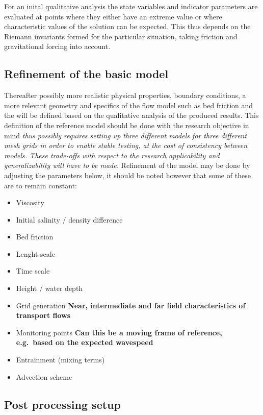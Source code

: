 For an inital qualitative analysis the state variables and indicator
parameters are evaluated at points where they either have an extreme
value or where characteristic values of the solution can be expected.
This thus depends on the Riemann invariants formed for the particular
situation, taking friction and gravitational forcing into account.

\subsection{Refinement of the basic
model}\label{refinement-of-the-basic-model}

Thereafter possibly more realistic physical properties, boundary
conditions, a more relevant geometry and specifics of the flow model
such as bed friction and the will be defined based on the qualitative
analysis of the produced results. This definition of the reference model
should be done with the research objective in mind \emph{thus possibly
requires setting up three different models for three different mesh
grids in order to enable stable testing, at the cost of consistency
between models. These trade-offs with respect to the research
applicability and generalizability will have to be made.} Refinement of
the model may be done by adjusting the parameters below, it should be
noted however that some of these are to remain constant:

\begin{itemize}
\tightlist
\item
  Viscosity
\item
  Initial salinity / density difference
\item
  Bed friction
\item
  Lenght scale
\item
  Time scale
\item
  Height / water depth
\item
  Grid generation \textbf{Near, intermediate and far field
  characteristics of transport flows}
\item
  Monitoring points \textbf{Can this be a moving frame of reference,
  e.g.~based on the expected wavespeed}
\item
  Entrainment (mixing terms)
\item
  Advection scheme
\end{itemize}

\subsection{Post processing setup}\label{post-processing-setup}

